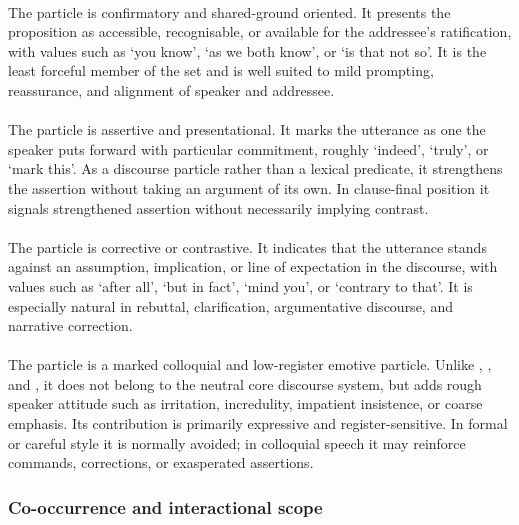\paragraph{} The particle  is confirmatory and shared-ground
oriented. It presents the proposition as accessible, recognisable, or available
for the addressee's ratification, with values such as `you know', `as we both
know', or `is that not so'. It is the least forceful member of the set and is
well suited to mild prompting, reassurance, and alignment of speaker and
addressee.

\paragraph{} The particle  is assertive and presentational.
It marks the utterance as one the speaker puts forward with particular
commitment, roughly `indeed', `truly', or `mark this'. As a discourse particle
rather than a lexical predicate, it strengthens the assertion without taking an
argument of its own. In
clause-final position it signals strengthened assertion without necessarily
implying contrast.

\paragraph{} The particle  is corrective or contrastive. It
indicates that the utterance stands against an assumption, implication, or line
of expectation in the discourse, with values such as `after all', `but in fact',
`mind you', or `contrary to that'. It is especially natural in rebuttal,
clarification, argumentative discourse, and narrative correction.

\paragraph{} The particle  is a marked colloquial and
low-register emotive particle. Unlike , , and , it
does not belong to the neutral core discourse system, but adds rough speaker
attitude such as irritation, incredulity, impatient insistence, or coarse
emphasis. Its contribution is primarily expressive and register-sensitive. In
formal or careful style it is normally avoided; in colloquial speech it may
reinforce commands, corrections, or exasperated assertions.

\subsubsection{Co-occurrence and interactional scope}
\label{sec:final-particle-combinations}

